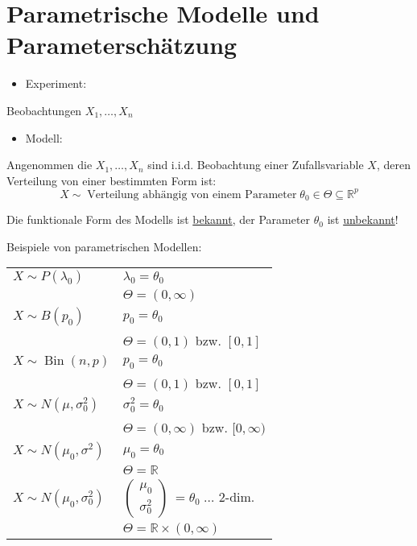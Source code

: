 \documentclass{tstextbook}
\DeclareMathOperator{\Bin}{Bin} %
\newcommand{\R}{\mathbb R}
\begin{document}
\section{Parametrische Modelle und Parameterschätzung}
		\label{parameterschaetzung}


\begin{itemize}
	\item Experiment:
\end{itemize}
Beobachtungen $ X_1,\ldots,X_n $\\

\begin{itemize}
	\item Modell:
\end{itemize}
Angenommen die $ X_1,\ldots,X_n $ sind i.i.d. Beobachtung einer Zufallsvariable $ X $, deren 
Verteilung von einer bestimmten Form ist:
	\[
	X\sim \; \text{Verteilung abhängig von einem Parameter} \; \theta_0 \in \Theta \subseteq \R^p
	\]
	
Die funktionale Form des Modells ist \underline{bekannt}, der Parameter $ \theta_0 $ ist \underline{unbekannt}!

\begin{example}
	Beispiele von parametrischen Modellen: \\
	
	
	\begin{tabular}{l|l}
			$ X\sim P(\lambda_0) $ 	& $ \lambda_0 = \theta_0 $ 				 \\
									& $ \Theta = \left(0,\infty\right) $ 	\\
			\midrule
			$ X\sim B(p_0) $		& $ p_0= \theta_0 $							\\
									& $ \Theta = \left(0,1\right) $ bzw. $ \left[0,1\right] $  \\
			\midrule
			$ X\sim \Bin(n,p)  $	& $ p_0= \theta_0 $						\\
			& $ \Theta = \left(0,1\right) $ bzw. $ \left[0,1\right] $  \\	
			\midrule
			$ X \sim N(\mu,\sigma_0^2) $ & $ \sigma_0^2 = \theta_0 $	 \\
									& $ \Theta = \left(0,\infty\right) $ bzw. $ [0,\infty) $  \\
			\midrule
			$ X \sim N(\mu_0,\sigma^2) $ & $ \mu_0 = \theta_0 $  \\
			& $ \Theta = \R $  \\
			\midrule
			$ X \sim N(\mu_0,\sigma_0^2) $ & $ \begin{pmatrix}
				\mu_0 \\ \sigma_0^2
			\end{pmatrix}\ = \theta_0 \; \ldots $ 2-dim.	 \\
			& $ \Theta = \R \times (0,\infty) $   		
		\end{tabular}

\end{example}
\end{document}
